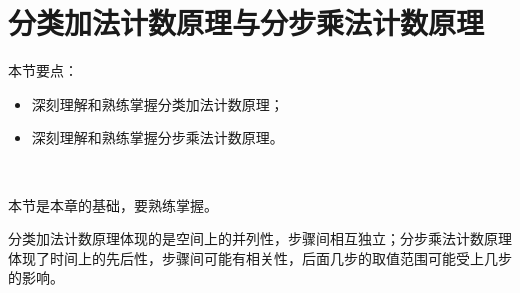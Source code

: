 \section{分类加法计数原理与分步乘法计数原理}

本节要点：
\begin{itemize}
    \item 深刻理解和熟练掌握分类加法计数原理；
    \item 深刻理解和熟练掌握分步乘法计数原理。
\end{itemize}

~

本节是本章的基础，要熟练掌握。

分类加法计数原理体现的是空间上的并列性，步骤间相互独立；分步乘法计数原理体现了时间上的先后性，步骤间可能有相关性，后面几步的取值范围可能受上几步的影响。




